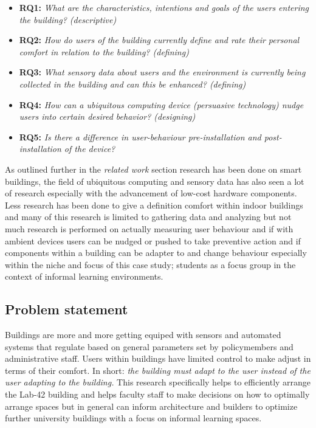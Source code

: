 \begin{itemize}
    \item \textbf{RQ1:} \emph{What are the characteristics, intentions and goals of the users entering the building? (descriptive)}
    \item \textbf{RQ2:} \emph{How do users of the building currently define and rate their personal comfort in relation to the building? (defining)}
    \item \textbf{RQ3:} \emph{What sensory data about users and the environment is currently being collected in the building and can this be enhanced? (defining)}
    \item \textbf{RQ4:} \emph{How can a ubiquitous computing device (persuasive technology) nudge users into certain desired behavior? (designing)}
    \item \textbf{RQ5:} \emph{Is there a difference in user-behaviour pre-installation and post-installation of the device?}
\end{itemize}

As outlined further in the \emph{related work} section research has been done on smart buildings, the field of ubiquitous computing and sensory data has also seen a lot of research especially with the advancement of low-cost hardware components. Less research has been done to give a definition comfort within indoor buildings and many of this research is limited to gathering data and analyzing but not much research is performed on actually measuring user behaviour and if with ambient devices users can be nudged or pushed to take preventive action and if components within a building can be adapter to and change behaviour especially within the niche and focus of this case study; students as a focus group in the context of informal learning environments.

\subsection{Problem statement}

Buildings are more and more getting equiped with sensors and automated systems that regulate based on general parameters set by policymembers and administrative staff. Users within buildings have limited control to make adjust in terms of their comfort. In short: \emph{the building must adapt to the user instead of the user adapting to the building.} This research specifically helps to efficiently arrange the Lab-42 building and helps faculty staff to make decisions on how to optimally arrange spaces but in general can inform architecture and builders to optimize further university buildings with a focus on informal learning spaces.

